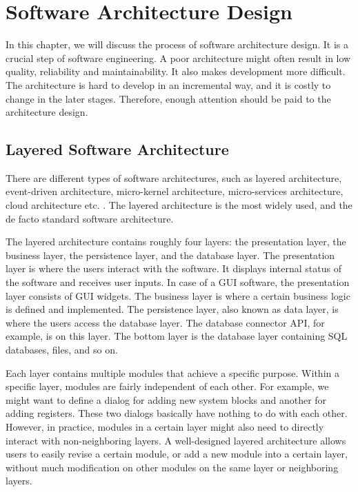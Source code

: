 \chapter{Software Architecture Design\label{ch:Software Architecture Design}}
In this chapter, we will discuss the process of software architecture design. It is a crucial step of software engineering. A poor architecture might often result in low quality, reliability and maintainability. It also makes development more difficult. The architecture is hard to develop in an incremental way, and it is costly to change in the later stages. Therefore, enough attention should be paid to the architecture design.

\section{Layered Software Architecture}
There are different types of software architectures, such as layered architecture, event-driven architecture, micro-kernel architecture, micro-services architecture, cloud architecture etc. \cite{richards2015software}. The layered architecture is the most widely used, and the de facto standard software architecture.

The layered architecture contains roughly four layers: the presentation layer, the business layer, the persistence layer, and the database layer. The presentation layer is where the users interact with the software. It displays internal status of the software and receives user inputs. In case of a GUI software, the presentation layer consists of GUI widgets. The business layer is where a certain business logic is defined and implemented. The persistence layer, also known as data layer, is where the users access the database layer. The database connector API, for example, is on this layer. The bottom layer is the database layer containing SQL databases, files, and so on.

Each layer contains multiple modules that achieve a specific purpose. Within a specific layer, modules are fairly independent of each other. For example, we might want to define a dialog for adding new system blocks and another for adding registers. These two dialogs basically have nothing to do with each other. However, in practice, modules in a certain layer might also need to directly interact with non-neighboring layers. A well-designed layered architecture allows users to easily revise a certain module, or add a new module into a certain layer, without much modification on other modules on the same layer or neighboring layers.

